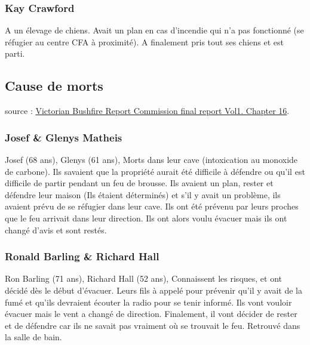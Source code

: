             \subsubsection{Kay Crawford}
                A un élevage de chiens.
                Avait un plan en cas d'incendie qui n'a pas fonctionné (se réfugier au centre CFA à proximité).
                A finalement pris tout ses chiens et est parti.

        \subsection{Cause de morts}

            source : \href{http://www.royalcommission.vic.gov.au/Finaldocuments/volume-1/HR/VBRC_Vol1_Chapter16_HR.pdf}{Victorian Bushfire Report Commission final report Vol1. Chapter 16}.

            \subsubsection{Josef \& Glenys Matheis}
                Josef (68 ans),
                Glenys (61 ans),
                Morts dans leur cave (intoxication au monoxide de carbone).
                Ils savaient que la propriété aurait été difficile à défendre ou qu'il est difficile de
                partir pendant un feu de brousse.
                Ils avaient un plan, rester et défendre leur maison (Ils étaient déterminés) et s'il y avait un problème,
                ils avaient prévu de se réfugier dans leur cave.
                Ils ont été prévenu par leurs proches que le feu arrivait dans leur direction.
                Ils ont alors voulu évacuer mais ils ont changé d'avis et sont restés.

            \subsubsection{Ronald Barling \& Richard Hall}
                Ron Barling (71 ans),
                Richard Hall (52 ans),
                Connaissent les risques, et ont décidé dès le début d'évacuer.
                Leurs fils à appelé pour prévenir qu'il y avait de la fumé et qu'ils devraient écouter la radio
                pour se tenir informé.
                Ils vont vouloir évacuer mais le vent a changé de direction. Finalement, il vont décider de rester et
                de défendre car ils ne savait pas vraiment où se trouvait le feu.
                Retrouvé dans la salle de bain.

